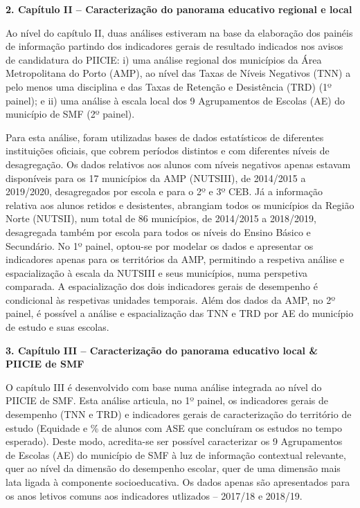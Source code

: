 \documentclass[
]{book}
\begin{document}
\textbf{2. Capítulo II -- Caracterização do panorama educativo regional e local}

Ao nível do capítulo II, duas análises estiveram na base da elaboração dos painéis de informação partindo dos indicadores gerais de resultado indicados nos avisos de candidatura do PIICIE: i) uma análise regional dos municípios da Área Metropolitana do Porto (AMP), ao nível das Taxas de Níveis Negativos (TNN) a pelo menos uma disciplina e das Taxas de Retenção e Desistência (TRD) (1º painel); e ii) uma análise à escala local dos 9 Agrupamentos de Escolas (AE) do município de SMF (2º painel).

Para esta análise, foram utilizadas bases de dados estatísticos de diferentes instituições oficiais, que cobrem períodos distintos e com diferentes níveis de desagregação. Os dados relativos aos alunos com níveis negativos apenas estavam disponíveis para os 17 municípios da AMP (NUTSIII), de 2014/2015 a 2019/2020, desagregados por escola e para o 2º e 3º CEB. Já a informação relativa aos alunos retidos e desistentes, abrangiam todos os municípios da Região Norte (NUTSII), num total de 86 municípios, de 2014/2015 a 2018/2019, desagregada também por escola para todos os níveis do Ensino Básico e Secundário. No 1º painel, optou-se por modelar os dados e apresentar os indicadores apenas para os territórios da AMP, permitindo a respetiva análise e espacialização à escala da NUTSIII e seus municípios, numa perspetiva comparada. A espacialização dos dois indicadores gerais de desempenho é condicional às respetivas unidades temporais. Além dos dados da AMP, no 2º painel, é possível a análise e espacialização das TNN e TRD por AE do município de estudo e suas escolas.

\textbf{3. Capítulo III -- Caracterização do panorama educativo local \& PIICIE de SMF}

O capítulo III é desenvolvido com base numa análise integrada ao nível do PIICIE de SMF. Esta análise articula, no 1º painel, os indicadores gerais de desempenho (TNN e TRD) e indicadores gerais de caracterização do território de estudo (Equidade e \% de alunos com ASE que concluíram os estudos no tempo esperado). Deste modo, acredita-se ser possível caracterizar os 9 Agrupamentos de Escolas (AE) do município de SMF à luz de informação contextual relevante, quer ao nível da dimensão do desempenho escolar, quer de uma dimensão mais lata ligada à componente socioeducativa. Os dados apenas são apresentados para os anos letivos comuns aos indicadores utlizados -- 2017/18 e 2018/19.
\end{document}
